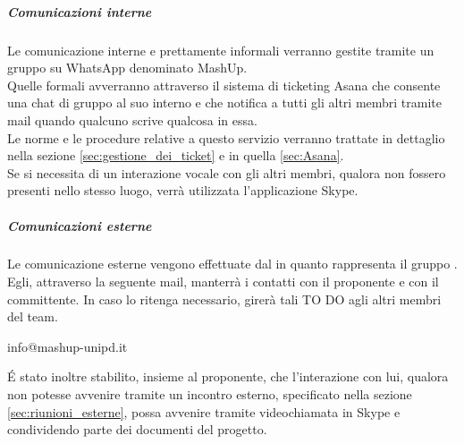 				\subparagraph{Comunicazioni interne} \label{sec:comunicazioni_interne}
Le comunicazione interne e prettamente informali verranno gestite tramite un gruppo su WhatsApp denominato MashUp. \\
Quelle formali avverranno attraverso il sistema di ticketing Asana che consente una chat di gruppo al suo interno e che notifica a tutti gli altri membri tramite mail quando qualcuno scrive qualcosa in essa. \\
Le norme e le procedure relative a questo servizio verranno trattate in dettaglio nella sezione \ref{sec:gestione_dei_ticket} e in quella \ref{sec:Asana}. \\
Se si necessita di un interazione vocale con gli altri membri, qualora non fossero presenti nello stesso luogo, verrà utilizzata l'applicazione Skype.
				\subparagraph{Comunicazioni esterne} \label{sec:comunicazioni_esterne}
Le comunicazione esterne vengono effettuate dal \roleProjectManager{} in quanto rappresenta il gruppo \groupName. \\
Egli, attraverso la seguente mail, manterrà i contatti con il proponente e con il committente. In caso lo ritenga necessario, girerà tali TO DO agli altri membri del team.
					\begin{center}
						info@mashup-unipd.it
					\end{center}
\'E stato inoltre stabilito, insieme al proponente, che l'interazione con lui, qualora non potesse avvenire tramite un incontro esterno, specificato nella sezione \ref{sec:riunioni_esterne}, possa avvenire tramite videochiamata in Skype	e condividendo parte dei documenti del progetto.	
